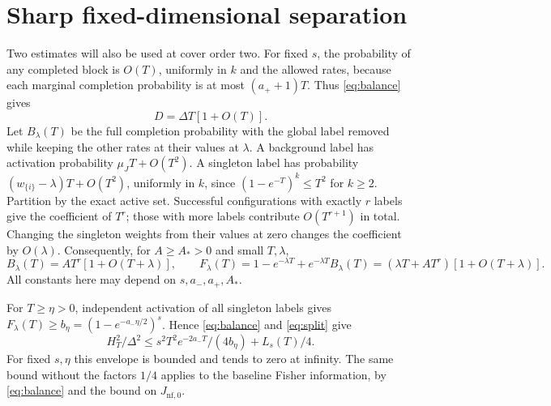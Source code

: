 \documentclass[11pt]{article}
\begin{document}
\section{Sharp fixed-dimensional separation}\label{sharp-fixed-dimensional-separation}

Two estimates will also be used at cover order two. For fixed \(s\), the probability of any completed block is \(O(T)\), uniformly in \(k\) and the allowed rates, because each marginal completion probability is at most \((a_++1)T\). Thus \eqref{eq:balance} gives
\[
D=\Delta T[1+O(T)].
\tag{5}\label{eq:Dshort}
\]
Let \(B_\lambda(T)\) be the full completion probability with the global label removed while keeping the other rates at their values at \(\lambda\). A background label has activation probability \(\mu_JT+O(T^2)\). A singleton label has probability \((w_{\{i\}}-\lambda)T+O(T^2)\), uniformly in \(k\), since \((1-e^{-T})^k\le T^2\) for \(k\ge2\). Partition by the exact active set. Successful configurations with exactly \(r\) labels give the coefficient of \(T^r\); those with more labels contribute \(O(T^{r+1})\) in total. Changing the singleton weights from their values at zero changes the coefficient by \(O(\lambda)\). Consequently, for \(A\ge A_*>0\) and small \(T,\lambda\),
\[
B_\lambda(T)=AT^r[1+O(T+\lambda)],\qquad
F_\lambda(T)=1-e^{-\lambda T}+e^{-\lambda T}B_\lambda(T)
=(\lambda T+AT^r)[1+O(T+\lambda)] .
\tag{6}\label{eq:Fshort}
\]
All constants here may depend on \(s,a_-,a_+,A_*\).

For \(T\ge\eta>0\), independent activation of all singleton labels gives \(F_\lambda(T)\ge b_\eta=(1-e^{-a_-\eta/2})^s\). Hence \eqref{eq:balance} and \eqref{eq:split} give
\[
H_T^2/\Delta^2\le s^2T^2e^{-2a_-T}/(4b_\eta)+L_s(T)/4.
\]
For fixed \(s,\eta\) this envelope is bounded and tends to zero at infinity. The same bound without the factors \(1/4\) applies to the baseline Fisher information, by \eqref{eq:balance} and the bound on \(J_{\mathrm{nf},0}\).
\end{document}

